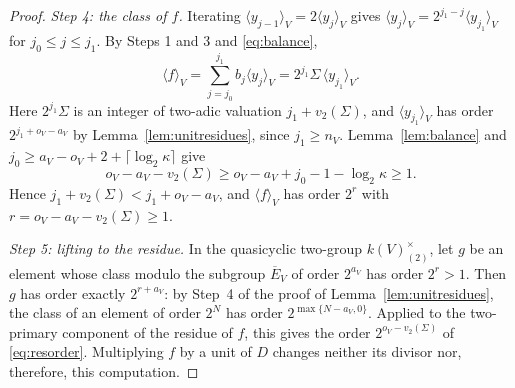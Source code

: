 \documentclass[11pt]{article}
\theoremstyle{plain}
\theoremstyle{definition}
\theoremstyle{remark}
\begin{document}
\begin{proof}
\emph{Step 4: the class of $f$.}  Iterating
$\langle y_{j-1}\rangle_V=2\langle y_j\rangle_V$ gives $\langle y_j\rangle_V=2^{j_1-j}\langle y_{j_1}\rangle_V$ for
$j_0\leq j\leq j_1$.  By Steps 1 and 3 and \eqref{eq:balance},
\[
 \langle f\rangle_V=\sum_{j=j_0}^{j_1}b_j\langle y_j\rangle_V=2^{j_1}\Sigma\,\langle y_{j_1}\rangle_V .
\]
Here $2^{j_1}\Sigma$ is an integer of two-adic valuation
$j_1+v_2(\Sigma)$, and $\langle y_{j_1}\rangle_V$ has order $2^{j_1+o_V-a_V}$ by
Lemma~\ref{lem:unitresidues}, since $j_1\geq n_V$.  Lemma~\ref{lem:balance}
and $j_0\geq a_V-o_V+2+\lceil\log_2\kappa\rceil$ give
\[
 o_V-a_V-v_2(\Sigma)\geq o_V-a_V+j_0-1-\log_2\kappa\geq1 .
\]
Hence $j_1+v_2(\Sigma)<j_1+o_V-a_V$, and $\langle f\rangle_V$ has order
$2^{r}$ with $r=o_V-a_V-v_2(\Sigma)\geq1$.

\emph{Step 5: lifting to the residue.}  In the quasicyclic two-group
$k(V)^\times_{(2)}$, let $g$ be an element whose class modulo the
subgroup $\overline E_V$ of order $2^{a_V}$ has order $2^r>1$.  Then $g$
has order exactly $2^{r+a_V}$: by Step~4 of the proof of
Lemma~\ref{lem:unitresidues}, the class of an element of order $2^N$ has
order $2^{\max\{N-a_V,0\}}$.  Applied to the two-primary component of the
residue of $f$, this gives the order $2^{o_V-v_2(\Sigma)}$ of
\eqref{eq:resorder}.  Multiplying $f$ by a unit of $D$ changes neither its
divisor nor, therefore, this computation.
\end{proof}
\end{document}

